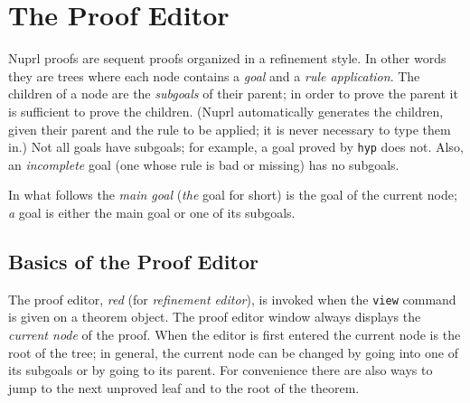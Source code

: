 \chapter{The Proof Editor}

{}Nuprl proofs are sequent{} proofs organized
in a refinement style.
In other words they are trees where each node contains a {\em goal}{}
and a {\em rule{} application}.
The children of a node are the {\em subgoals}{}
of their parent; in order to prove the parent it is sufficient to prove
the children.
(Nuprl automatically generates the children, given their parent and the rule
to be applied; it is never necessary to type them in.)
Not all goals have subgoals; for example, a goal proved by {\tt hyp}
does not.
Also, an {\em incomplete} goal (one whose rule is bad or missing) has no
subgoals.

In what follows the {\em main goal} ({\em the} goal for short)
is the goal of the current node;
{\em a} goal is either the main goal or one of its subgoals.

\section{Basics of the Proof Editor}

The proof{} editor, {\em red}{} (for
{\em refinement{} editor}),
is invoked when the {\tt view} command is given on a theorem object.
The proof editor window always displays the {\em current node} of the proof.
When the editor is first entered the current node is the root of the tree;
in general, the current node can be changed by going into one of its subgoals
or by going to its parent.
For convenience there are also ways to jump to the next unproved leaf
and to the root of the theorem.

